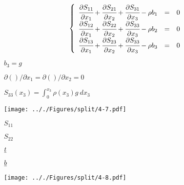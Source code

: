 \documentclass[onecolumn,11pt]{report}
\def\lthtmlcheckvsize{\ifdim\ht\sizebox<\vsize 
  \ifdim\wd\sizebox<\hsize\expandafter\hfill\fi \expandafter\vfill
  \else\expandafter\vss\fi}%
\begin{document}
{\newpage\clearpage
{}%
\begin{displaymath}\displaystyle
\left\lbrace
\begin{array}{rcl}
\cfrac{\partial S_{11}}{\partial x_1} +
\cfrac{\partial S_{21}}{\partial x_2} +
\cfrac{\partial S_{31}}{\partial x_3} -
\rho b_1 & = & 0 \\
\cfrac{\partial S_{12}}{\partial x_1} +
\cfrac{\partial S_{22}}{\partial x_2} +
\cfrac{\partial S_{33}}{\partial x_3} -
\rho b_2 & = & 0 \\
\cfrac{\partial S_{13}}{\partial x_1} +
\cfrac{\partial S_{23}}{\partial x_2} +
\cfrac{\partial S_{33}}{\partial x_3} -
\rho b_3 & = & 0 \\
\end{array}
\right.\end{displaymath}%
\lthtmldisplayZ
\lthtmlcheckvsize\clearpage}

{\newpage\clearpage
{}%
$ b_3 = g$%
\lthtmlindisplaymathZ
\lthtmlcheckvsize\clearpage}

{\newpage\clearpage
{}%
$ \partial()/\partial x_1 = \partial()/\partial x_2 = 0$%
\lthtmlindisplaymathZ
\lthtmlcheckvsize\clearpage}

{\newpage\clearpage
{}%
$\displaystyle S_{33}(x_3) = \int_0^{x_3} \rho(x_3) g \: dx_3$%
\lthtmlindisplaymathZ
\lthtmlcheckvsize\clearpage}

{\newpage\clearpage
{}%
\texttt{[image: .././Figures/split/4-7.pdf]}%
\lthtmlpictureZ
\lthtmlcheckvsize\clearpage}

{\newpage\clearpage
{}%
$ S_{11}$%
\lthtmlindisplaymathZ
\lthtmlcheckvsize\clearpage}

{\newpage\clearpage
{}%
$ S_{22}$%
\lthtmlindisplaymathZ
\lthtmlcheckvsize\clearpage}

{\newpage\clearpage
{}%
$ \uline{t}$%
\lthtmlindisplaymathZ
\lthtmlcheckvsize\clearpage}

{\newpage\clearpage
{}%
$ \uline{b}$%
\lthtmlindisplaymathZ
\lthtmlcheckvsize\clearpage}

{\newpage\clearpage
{}%
\texttt{[image: .././Figures/split/4-8.pdf]}%
\lthtmlpictureZ
\lthtmlcheckvsize\clearpage}
\end{document}
